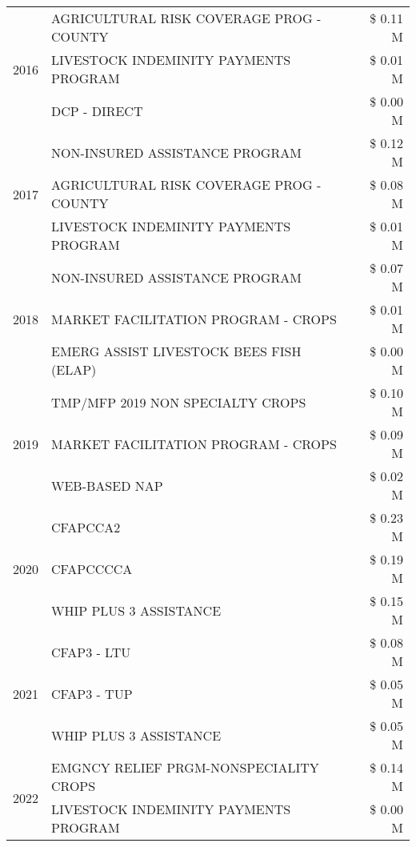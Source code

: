 \begin{tabular}{llr}
\cline{1-3}
\multirow[t]{3}{*}{2016} & AGRICULTURAL RISK COVERAGE PROG - COUNTY & \$ 0.11 M \\
 & LIVESTOCK INDEMINITY PAYMENTS PROGRAM & \$ 0.01 M \\
 & DCP - DIRECT & \$ 0.00 M \\
\cline{1-3}
\multirow[t]{3}{*}{2017} & NON-INSURED ASSISTANCE PROGRAM & \$ 0.12 M \\
 & AGRICULTURAL RISK COVERAGE PROG - COUNTY & \$ 0.08 M \\
 & LIVESTOCK INDEMINITY PAYMENTS PROGRAM & \$ 0.01 M \\
\cline{1-3}
\multirow[t]{3}{*}{2018} & NON-INSURED ASSISTANCE PROGRAM & \$ 0.07 M \\
 & MARKET FACILITATION PROGRAM - CROPS & \$ 0.01 M \\
 & EMERG ASSIST LIVESTOCK BEES FISH (ELAP) & \$ 0.00 M \\
\cline{1-3}
\multirow[t]{3}{*}{2019} & TMP/MFP 2019 NON SPECIALTY CROPS & \$ 0.10 M \\
 & MARKET FACILITATION PROGRAM - CROPS & \$ 0.09 M \\
 & WEB-BASED NAP & \$ 0.02 M \\
\cline{1-3}
\multirow[t]{3}{*}{2020} & CFAPCCA2 & \$ 0.23 M \\
 & CFAPCCCCA & \$ 0.19 M \\
 & WHIP PLUS 3 ASSISTANCE & \$ 0.15 M \\
\cline{1-3}
\multirow[t]{3}{*}{2021} & CFAP3 - LTU & \$ 0.08 M \\
 & CFAP3 - TUP & \$ 0.05 M \\
 & WHIP PLUS 3 ASSISTANCE & \$ 0.05 M \\
\cline{1-3}
\multirow[t]{2}{*}{2022} & EMGNCY RELIEF PRGM-NONSPECIALITY CROPS & \$ 0.14 M \\
 & LIVESTOCK INDEMINITY PAYMENTS PROGRAM & \$ 0.00 M \\
\cline{1-3}
\bottomrule
\end{tabular}

